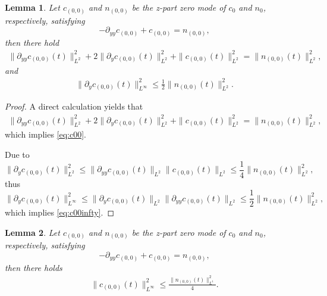 \documentclass[12pt, reqno]{amsart}
\newtheorem{lemma}{Lemma}[section]
\newcommand{\ben}{\begin{eqnarray}}
\newcommand{\een}{\end{eqnarray}}
\numberwithin{equation}{section}
\begin{document}
	\begin{lemma}\label{lem:ellip_3}
		Let $c_{(0,0)}$ and $n_{(0,0)}$ be the z-part zero mode of $c_0$ and $n_0$,
		respectively, satisfying
		$$-\partial_{yy} c_{(0,0 )}+c_{(0,0 )}=n_{(0,0)},$$
		then there hold
		\ben\label{eq:c00}
		\|\partial_{yy} c_{(0,0 )}(t)\|^2_{L^2}
		+2\|\partial_{y} c_{(0,0 )}(t)\|^2_{L^2}
		+\|c_{(0,0 )}(t)\|^2_{L^2}=\|n_{(0,0 )}(t)\|^2_{L^2},
		\een
		and
		\ben\label{eq:c00infty}
		\|\partial_{y} c_{(0,0 )}(t)\|^2_{L^{\infty}}
		\leq \frac{1}{2}\|n_{(0,0 )}(t)\|^2_{L^2}.
		\een
	\end{lemma}
	\begin{proof}
		A direct calculation yields that 
		\begin{align*}
			\|\partial_{yy} c_{(0,0 )}(t)\|^2_{L^2}
			+2\|\partial_{y} c_{(0,0 )}(t)\|^2_{L^2}
			+\|c_{(0,0 )}(t)\|^2_{L^2}=\|n_{(0,0 )}(t)\|^2_{L^2},
		\end{align*}
		which implies \eqref{eq:c00}.
		
		Due to 
		$$\|\partial_{y} c_{(0,0 )}(t)\|^2_{L^2}\leq 
		\|\partial_{yy} c_{(0,0 )}(t)\|_{L^2}\| c_{(0,0 )}(t)\|_{L^2}
		\leq \frac{1}{4}\|n_{(0,0 )}(t)\|^2_{L^2},$$
		thus
		$$\|\partial_{y} c_{(0,0 )}(t)\|^2_{L^{\infty}}\leq \|\partial_{y} c_{(0,0 )}(t)\|_{L^{2}}\|\partial_{yy} c_{(0,0 )}(t)\|_{L^{2}}
		\leq \frac{1}{2}\|n_{(0,0 )}(t)\|^2_{L^2},$$
		which implies \eqref{eq:c00infty}.
		
	\end{proof}	
	\begin{lemma}\label{lem:ellip_30}
		Let $c_{(0,0)}$ and $n_{(0,0)}$ be the z-part zero mode of $c_0$ and $n_0$,
		respectively, satisfying
		$$-\partial_{yy} c_{(0,0 )}+c_{(0,0 )}=n_{(0,0)},$$
		then there holds
		\begin{equation*}
			\begin{aligned}
				\|c_{(0,0)}(t)\|^2_{L^{\infty}}\leq \frac{\|n_{(0,0)}(t)\|^2_{L^1}}{4}.    		
			\end{aligned}
		\end{equation*}
	\end{lemma}
\end{document}
